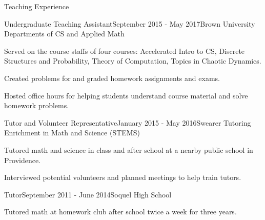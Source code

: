 \documentclass{cv} %
\begin{document}
\begin{rSection}{Teaching Experience}
\begin{rSubsection}{Undergraduate Teaching Assistant}{September 2015 - May 2017}{Brown University Departments of CS and Applied Math}{}
\item Served on the course staffs of four courses: Accelerated Intro to CS, Discrete Structures and Probability, Theory of Computation, Topics in Chaotic Dynamics.
\item Created problems for and graded homework assignments and exams.
\item Hosted office hours for helping students understand course material and solve homework problems.
\end{rSubsection}

\begin{rSubsection}{Tutor and Volunteer Representative}{January 2015 - May 2016}{Swearer Tutoring Enrichment in Math and Science (STEMS)}{}
\item Tutored math and science in class and after school at a nearby public school in Providence.
\item Interviewed potential volunteers and planned meetings to help train tutors.
\end{rSubsection}

\begin{rSubsection}{Tutor}{September 2011 - June 2014}{Soquel High School}{}
\item Tutored math at homework club after school twice a week for three years.
\end{rSubsection}

\end{rSection}

\end{document}
